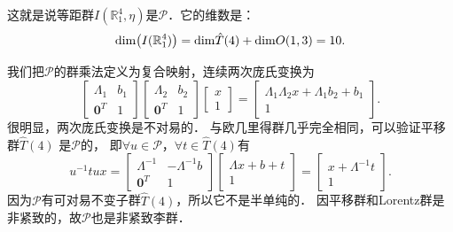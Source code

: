 这就是说等距群$I(\mathbb{R}^4_1,\eta)$是$\mathcal{P}$．它的维数是：
\begin{equation}
    {\rm dim}\bigl(I(\mathbb{R}^4_1)\bigr)= {\rm dim}  \hat{T}(4) + {\rm dim} O(1,3) = 10 .
\end{equation}


我们把$\mathcal{P}$的群乘法定义为复合映射，连续两次庞氏变换为
\begin{equation}\label{chlg:eqn_tmpptp}
    \begin{bmatrix}  \Lambda_1 & b_1 \\ \boldsymbol{0}^T & 1  \end{bmatrix}
    \begin{bmatrix}  \Lambda_2 & b_2 \\ \boldsymbol{0}^T & 1  \end{bmatrix}
    \begin{bmatrix}  x \\ 1 \end{bmatrix} 
    =\begin{bmatrix} \Lambda_1 \Lambda_2 x + \Lambda_1 b_2 + b_1 \\  1  \end{bmatrix}.
\end{equation}
很明显，两次庞氏变换是不对易的．
与欧几里得群几乎完全相同，可以验证平移群$\hat{T}(4)$
是$\mathcal{P}$的，
即$\forall u \in \mathcal{P}$，$\forall t \in \hat{T}(4)$有
\begin{equation}
    u^{-1} t u x= 
    \begin{bmatrix}  \Lambda^{-1} & -\Lambda^{-1} b \\ \boldsymbol{0}^T & 1    \end{bmatrix}
    \begin{bmatrix}  \Lambda x + b + t\\  1  \end{bmatrix}
    =\begin{bmatrix} x + \Lambda^{-1} t\\  1  \end{bmatrix}.
\end{equation}
因为$\mathcal{P}$有可对易不变子群$\hat{T}(4)$，所以它不是半单纯的．
因平移群和Lorentz群是非紧致的，故$\mathcal{P}$也是非紧致李群．

